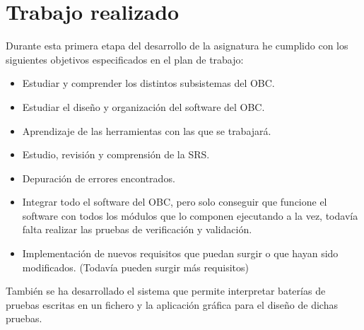 
\section{Trabajo realizado}

Durante esta primera etapa del desarrollo de la asignatura he cumplido con los
siguientes objetivos especificados en el plan de trabajo:

\begin{itemize}
\item Estudiar y comprender los distintos subsistemas del OBC.
\item Estudiar el diseño y organización del software del OBC.
\item Aprendizaje de las herramientas con las que se trabajará.
\item Estudio, revisión y comprensión de la SRS.
\item Depuración de errores encontrados.
\item Integrar todo el software del OBC, pero solo conseguir que funcione
  el software con todos los módulos que lo componen ejecutando a la vez,
  todavía falta realizar las pruebas de verificación y validación.
\item Implementación de nuevos requisitos que puedan surgir o que hayan sido
  modificados. (Todavía pueden surgir más requisitos)
\end{itemize}

También se ha desarrollado el sistema que permite interpretar baterías de
pruebas escritas en un fichero y la aplicación gráfica para el diseño
de dichas pruebas.